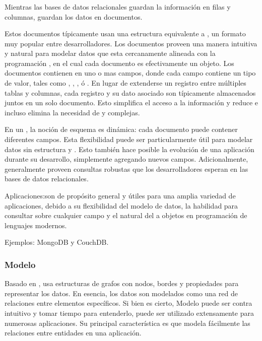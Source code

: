 \subsubsection{\documentModel}\label{cap:justificacion_proyecto:base_datos:nosql:document_model}

 Mientras las bases de datos relacionales guardan la información en filas y columnas, \documentDB \dataBasesDB guardan los datos en documentos.  

Estos documentos típicamente usan una estructura equivalente a \jsonNAME, un formato muy popular entre desarrolladores. Los documentos proveen una manera intuitiva y natural para modelar datos que esta cercanamente alineada con la programación \objectOrientedPL, en el cual cada documento es efectivamente un objeto. Los documentos contienen en uno o mas campos, donde cada campo contiene un tipo de valor, tales como \stringPL, \datePL, \binaryPL, ó \arrayPL. En lugar de extenderse un registro entre múltiples tablas y columnas, cada registro y su dato asociado son típicamente almacenados juntos en un solo documento. Esto simplifica el acceso a la información y reduce e incluso elimina la necesidad de \joins y \transactionsDB complejas.

En un \documentDB \dataBaseDB, la noción de esquema es dinámica: cada documento puede contener diferentes campos. Esta flexibilidad puede ser particularmente útil para modelar datos sin estructura y \polymorphic. Esto también hace posible la evolución de una aplicación durante su desarrollo, simplemente agregando nuevos campos. Adicionalmente, \documentDB \dataBasesDB generalmente proveen consultas robustas que los desarrolladores esperan en las bases de datos relacionales.

Aplicaciones:\documentDB \dataBasesDB son de propósito general y útiles para una amplia variedad de aplicaciones, debido a su flexibilidad del modelo de datos, la habilidad para consultar sobre cualquier campo y el \mapping natural del \documentDB \dataModel a objetos en programación de lenguajes modernos.

Ejemplos: MongoDB y CouchDB.

\subsubsection{Modelo \graphCustom}
\label{cap:justificacion_proyecto:base_datos:nosql:graph_model}

Basado en \graphTheory, usa estructuras de grafos con nodos, bordes y propiedades para representar los datos. En esencia, los datos son modelados como una red de relaciones entre elementos específicos. Si bien es cierto, Modelo \graphCustom puede ser contra intuitivo y tomar tiempo para entenderlo, puede ser utilizado extensamente para numerosas aplicaciones. Su principal característica es que modela fácilmente las relaciones entre entidades en una aplicación.

